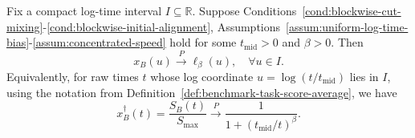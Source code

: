 \begin{theorem}
\label{thm:aggregate-logsigmoid-frontier-limit-new}
Fix a compact log-time interval \(I \subseteq \mathbb{R}\). Suppose Conditions~\ref{cond:blockwise-cut-mixing}-\ref{cond:blockwise-initial-alignment}, Assumptions~\ref{assum:uniform-log-time-bias}-\ref{assum:concentrated-speed} hold for some \(t_{\mathrm{mid}} > 0\) and \(\beta > 0\). Then 
\[
    x_B(u) \stackrel{P}{\to} \ell_\beta(u), \quad \forall u \in I.
\]
Equivalently, for raw times \(t\) whose log coordinate \(u=\log(t/t_{\mathrm{mid}})\) lies in \(I\), using the notation from Definition~\ref{def:benchmark-task-score-average}, we have
\begin{equation}
    x_B^\dagger(t) = \frac{S_B(t)}{S_{\max}}\stackrel{P}{\longrightarrow}
    \frac{1}{1+(t_{\mathrm{mid}}/t)^\beta}.
    \label{eq:aggregate-raw-time-law-new}
\end{equation}
\end{theorem}


